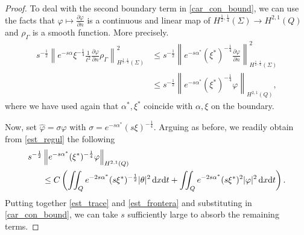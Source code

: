 \documentclass{dcds-bOF}
\theoremstyle{definition}
\def\csbd{\rho_{\Gamma}}
\def\dx{\,\textnormal{d}x}
\def\dt{\textnormal{d}t}
\begin{document}
\begin{proof}
To deal with the second boundary term in \eqref{car_con_bound}, we can use the facts that $\varphi \mapsto \frac{\partial \varphi }{\partial n}$ is a continuous and linear map of $H^{\frac12,\frac14}(\Sigma)\to H^{2,1}(Q)$ and $\csbd$ is a smooth function. More precisely.
\begin{equation}\label{est_trace}
\begin{split}
s^{-\frac{1}{2}}\left\|e^{-s\alpha}\xi^{-\frac{1}{4}} \frac{1}{\ell^2} \frac{\partial \varphi}{\partial n}\csbd \right\|^2_{H^{\frac{1}{2},\frac{1}{4}}(\Sigma)} & \leq s^{-\frac{1}{2}}\left\|e^{-s\alpha^*}(\xi^*)^{-\frac{1}{4}} \frac{\partial \varphi}{\partial n} \right\|^2_{H^{\frac{1}{2},\frac{1}{4}}(\Sigma)} \\
&\leq s^{-\frac{1}{2}}\left\| e^{-s\alpha^*}(\xi^*)^{-\frac{1}{4}} \varphi \right\|_{H^{2,1}(Q)},
\end{split}
\end{equation}
%
where we have used again that $\alpha^*,\xi^*$ coincide with $\alpha,\xi$ on the boundary.

Now, set $\widehat \varphi=\sigma \varphi$ with $\sigma=e^{-s\alpha^*}(s\xi)^{-\frac{1}{4}}$. Arguing as before, we readily obtain from \eqref{est_regul} the following
%
\begin{equation}\label{est_frontera}
\begin{split}
s^{-\frac{1}{2}}&\left\| e^{-s\alpha^*}(\xi^*)^{-\frac{1}{4}} \varphi \right\|_{H^{2,1}(Q)}\\
&\leq C\left(\iint_{Q}e^{-2s\alpha^*}(s\xi^*)^{-\frac{1}{2}}|\theta|^2\dx\dt+\iint_{Q}e^{-2s\alpha^*}(s\xi^*)^2|\varphi|^2\dx\dt\right).
\end{split}
\end{equation}
%
Putting together \eqref{est_trace} and \eqref{est_frontera} and substituting in \eqref{car_con_bound}, we can take $s$ sufficiently large to absorb the remaining terms.


\end{proof}
\end{document}
